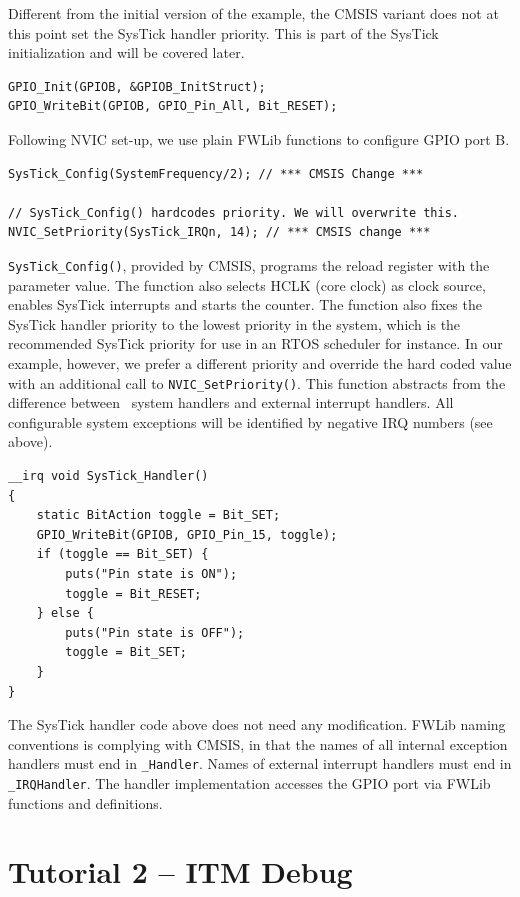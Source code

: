 Different from the initial version of the example, the CMSIS variant does not at
this point set the SysTick handler priority. This is part of the SysTick
initialization and will be covered later.

\begin{lstlisting}[style=cpp]
GPIO_Init(GPIOB, &GPIOB_InitStruct);
GPIO_WriteBit(GPIOB, GPIO_Pin_All, Bit_RESET);
\end{lstlisting}

Following NVIC set-up, we use plain FWLib functions to configure GPIO port B.

\begin{lstlisting}[style=cpp]
SysTick_Config(SystemFrequency/2); // *** CMSIS Change ***

// SysTick_Config() hardcodes priority. We will overwrite this.
NVIC_SetPriority(SysTick_IRQn, 14); // *** CMSIS change ***
\end{lstlisting}

\verb|SysTick_Config()|, provided by CMSIS, programs the reload register with
the parameter value. The function also selects HCLK (core clock) as clock
source, enables SysTick interrupts and starts the counter. The function also
fixes the SysTick handler priority to the lowest priority in the system, which
is the recommended SysTick priority for use in an RTOS scheduler for instance.
In our example, however, we prefer a different priority and override the hard
coded value with an additional call to \verb|NVIC_SetPriority()|. This function
abstracts from the difference between \ system handlers and external
interrupt handlers. All configurable system exceptions will be identified by
negative IRQ numbers (see above).

\begin{lstlisting}[style=cpp]
__irq void SysTick_Handler()
{
	static BitAction toggle = Bit_SET;
	GPIO_WriteBit(GPIOB, GPIO_Pin_15, toggle);
	if (toggle == Bit_SET) {
		puts("Pin state is ON");
		toggle = Bit_RESET;
	} else {
		puts("Pin state is OFF");
		toggle = Bit_SET;
	}
}
\end{lstlisting}

The SysTick handler code above does not need any modification. FWLib naming
conventions is complying with CMSIS, in that the names of all internal exception
handlers must end in \verb|_Handler|. Names of external interrupt handlers must
end in \verb|_IRQHandler|. The handler implementation accesses the GPIO port via
FWLib functions and definitions.

\section{Tutorial 2 – ITM Debug}

